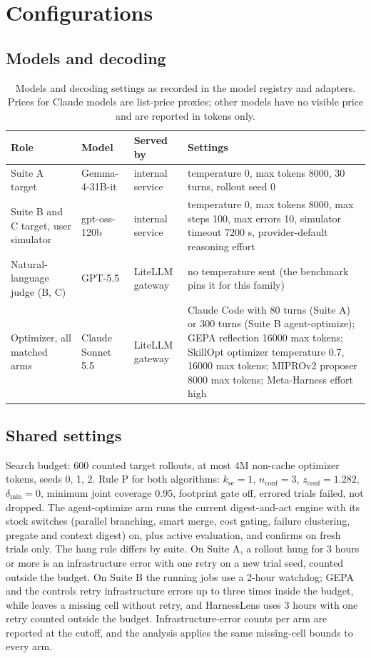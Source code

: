 \section{Configurations}
\label{app:config}

\subsection{Models and decoding}

\begin{table}[h]
\caption{Models and decoding settings as recorded in the model registry and adapters. Prices for Claude models are list-price proxies; other models have no visible price and are reported in tokens only.}
\label{tab:models}
\centering\small
\begin{tabularx}{\textwidth}{@{}lllX@{}}
\toprule
Role & Model & Served by & Settings \\
\midrule
Suite A target & Gemma-4-31B-it & internal service & temperature 0, max tokens 8000, 30 turns, rollout seed 0 \\
Suite B and C target, user simulator & gpt-oss-120b & internal service & temperature 0, max tokens 8000, max steps 100, max errors 10, simulator timeout 7200 s, provider-default reasoning effort \\
Natural-language judge (B, C) & GPT-5.5 & LiteLLM gateway & no temperature sent (the benchmark pins it for this family) \\
Optimizer, all matched arms & Claude Sonnet 5.5 & LiteLLM gateway & Claude Code with 80 turns (Suite A) or 300 turns (Suite B agent-optimize); GEPA reflection 16000 max tokens; SkillOpt optimizer temperature 0.7, 16000 max tokens; MIPROv2 proposer 8000 max tokens; Meta-Harness effort high \\
\bottomrule
\end{tabularx}
\end{table}

\subsection{Shared settings}

Search budget: 600 counted target rollouts, at most 4M non-cache optimizer tokens, seeds 0, 1, 2. Rule P for both \capevolve{} algorithms: $k_{\mathrm{se}}=1$, $n_{\mathrm{conf}}=3$, $z_{\mathrm{conf}}=1.282$, $\delta_{\min}=0$, minimum joint coverage 0.95, footprint gate off, errored trials failed, not dropped. The agent-optimize arm runs the current digest-and-act engine with its stock switches (parallel branching, smart merge, cost gating, failure clustering, pregate and context digest) on, plus active evaluation, and confirms on fresh trials only. The hang rule differs by suite. On Suite A, a rollout hung for 3 hours or more is an infrastructure error with one retry on a new trial seed, counted outside the budget. On Suite B the running jobs use a 2-hour watchdog; GEPA and the controls retry infrastructure errors up to three times inside the budget, while \capevolve{} leaves a missing cell without retry, and HarnessLens uses 3 hours with one retry counted outside the budget. Infrastructure-error counts per arm are reported at the cutoff, and the analysis applies the same missing-cell bounds to every arm.

